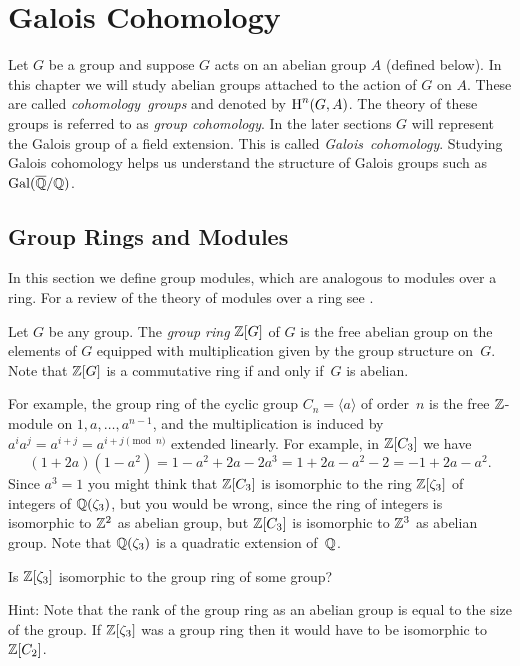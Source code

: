 \chapter{Galois Cohomology}\label{ch:gc}

Let $G$ be a group and suppose $G$ acts on an abelian group $A$
(defined below). In this chapter we will study abelian groups attached
to the action of $G$ on $A$. These are called \emph{cohomology~groups}
and denoted by $\operatorname{H}^n(G,A)$. The theory of these groups is referred
to as \emph{group cohomology}. In the later sections $G$ will represent
the Galois group of a field extension. This is called
\emph{Galois~cohomology}. Studying Galois cohomology helps us
understand the structure of Galois groups such as $\operatorname{Gal}(\overline{\mathbb{Q}}/\mathbb{Q})$.

\section{Group Rings and Modules}

In this section we define group modules, which are analogous
to modules over a ring. For a review of the theory of modules
over a ring see \cite[Ch.~10]{dummit2004abstract}.

\begin{definition}\label{def:groupring}
	Let $G$ be any group. The \emph{group ring} $\mathbb{Z}[G]$ of $G$
	is the free abelian group on the elements of $G$ equipped
	with multiplication given by the group structure on~$G$.
	Note that $\mathbb{Z}[G]$ is a commutative ring if and only if~$G$ is
	abelian.
\end{definition}

\begin{example}
	For example, the group ring of the cyclic group
	$C_n=\langle a\rangle$ of order~$n$ is
	the free $\mathbb{Z}$-module on $1,a,\ldots, a^{n-1}$, and the multiplication
	is induced by $a^i a^j = a^{i+j} = a^{i + j \pmod{n}}$ extended
	linearly. For example, in  $\mathbb{Z}[C_3]$ we have
	$$
	(1 + 2 a)(1 - a^2) = 1 - a^2 + 2a - 2 a^3
	= 1 + 2a - a^2 - 2 = -1 + 2a - a^2.
	$$
	Since $a^3 = 1$
	you might think that $\mathbb{Z}[C_3]$ is isomorphic to the ring $\mathbb{Z}[\zeta_3]$
	of integers of $\mathbb{Q}(\zeta_3)$, but you would be wrong, since the ring
	of integers is isomorphic to $\mathbb{Z}^2$ as abelian group, but $\mathbb{Z}[C_3]$
	is isomorphic to $\mathbb{Z}^3$ as abelian group. Note that $\mathbb{Q}(\zeta_3)$
	is a quadratic extension of~$\mathbb{Q}$.
\end{example}

\begin{exercise}
	Is $\mathbb{Z}[\zeta_3]$ isomorphic to the group ring of some group?
	
	Hint: Note that the rank of the group ring as an
	abelian group is equal to the size of the group.
	If $\mathbb{Z}[\zeta_3]$ was a group ring then it would
	have to be isomorphic to $\mathbb{Z}[C_2]$.
\end{exercise}

